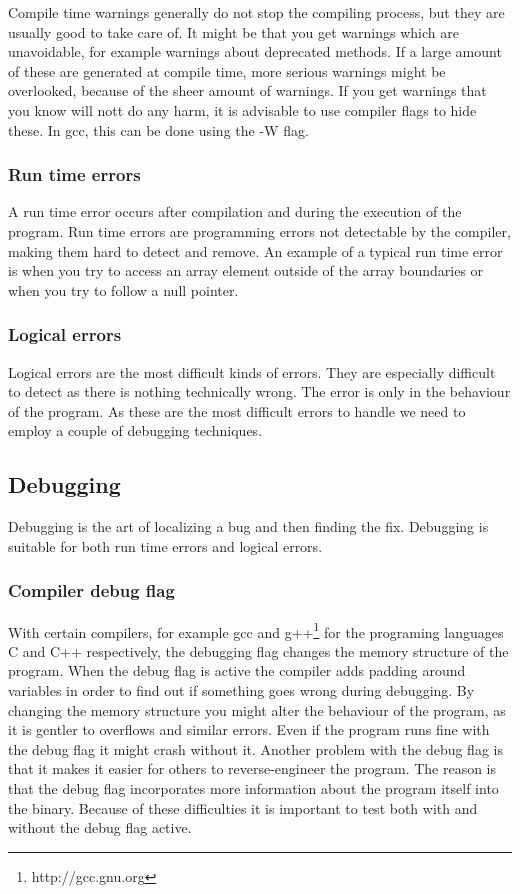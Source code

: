 \documentclass[11pt,a4paper,twoside]{article}
\begin{document}
Compile time warnings generally do not stop the compiling process, but they are
usually good to take care of. It might be that you get warnings which are
unavoidable, for example warnings about deprecated methods. If a large amount
of these are generated at compile time, more serious warnings might be
overlooked, because of the sheer amount of warnings. If you get warnings that
you know will nott do any harm, it is advisable to use compiler flags to hide
these. In gcc, this can be done using the -W flag.

\subsubsection{Run time errors}

A run time error occurs after compilation and during the execution of the
program. Run time errors are programming errors not detectable by the compiler,
making them hard to detect and remove. An example of a typical run time error
is when you try to access an array element outside of the array boundaries or
when you try to follow a null pointer.

\subsubsection{Logical errors}

Logical errors are the most difficult kinds of errors. They are especially
difficult to detect as there is nothing technically wrong. The error is only in
the behaviour of the program. As these are the most difficult errors to handle
we need to employ a couple of debugging techniques.

\subsection{Debugging}

Debugging is the art of localizing a bug and then finding the fix. Debugging is
suitable for both run time errors and logical errors. 

\subsubsection{Compiler debug flag}

With certain compilers, for example gcc and g++\footnote{http://gcc.gnu.org}
for the programing languages C and C++ respectively, the debugging flag changes
the memory structure of the program. When the debug flag is active the compiler
adds padding around variables in order to find out if something goes wrong
during debugging. By changing the memory structure you might alter the
behaviour of the program, as it is gentler to overflows and similar errors.
Even if the program runs fine with the debug flag it might crash without it.
Another problem with the debug flag is that it makes it easier for others to
reverse-engineer the program. The reason is that the debug flag incorporates
more information about the program itself into the binary. Because of these
difficulties it is important to test both with and without the debug flag
active.
\end{document}

